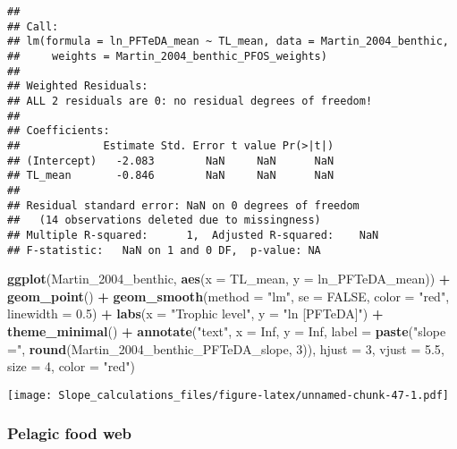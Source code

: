 \documentclass[
]{article}
\newenvironment{Shaded}{\begin{snugshade}}{\end{snugshade}}
\newcommand{\AttributeTok}[1]{\textcolor[rgb]{0.13,0.29,0.53}{#1}}
\newcommand{\ConstantTok}[1]{\textcolor[rgb]{0.56,0.35,0.01}{#1}}
\newcommand{\DecValTok}[1]{\textcolor[rgb]{0.00,0.00,0.81}{#1}}
\newcommand{\FloatTok}[1]{\textcolor[rgb]{0.00,0.00,0.81}{#1}}
\newcommand{\FunctionTok}[1]{\textcolor[rgb]{0.13,0.29,0.53}{\textbf{#1}}}
\newcommand{\NormalTok}[1]{#1}
\newcommand{\SpecialCharTok}[1]{\textcolor[rgb]{0.81,0.36,0.00}{\textbf{#1}}}
\newcommand{\StringTok}[1]{\textcolor[rgb]{0.31,0.60,0.02}{#1}}
\begin{document}
\begin{verbatim}
## 
## Call:
## lm(formula = ln_PFTeDA_mean ~ TL_mean, data = Martin_2004_benthic, 
##     weights = Martin_2004_benthic_PFOS_weights)
## 
## Weighted Residuals:
## ALL 2 residuals are 0: no residual degrees of freedom!
## 
## Coefficients:
##             Estimate Std. Error t value Pr(>|t|)
## (Intercept)   -2.083        NaN     NaN      NaN
## TL_mean       -0.846        NaN     NaN      NaN
## 
## Residual standard error: NaN on 0 degrees of freedom
##   (14 observations deleted due to missingness)
## Multiple R-squared:      1,  Adjusted R-squared:    NaN 
## F-statistic:   NaN on 1 and 0 DF,  p-value: NA
\end{verbatim}

\begin{Shaded}
\begin{Highlighting}[]
\FunctionTok{ggplot}\NormalTok{(Martin\_2004\_benthic, }\FunctionTok{aes}\NormalTok{(}\AttributeTok{x =}\NormalTok{ TL\_mean, }\AttributeTok{y =}\NormalTok{ ln\_PFTeDA\_mean)) }\SpecialCharTok{+}
  \FunctionTok{geom\_point}\NormalTok{() }\SpecialCharTok{+}
  \FunctionTok{geom\_smooth}\NormalTok{(}\AttributeTok{method =} \StringTok{"lm"}\NormalTok{, }\AttributeTok{se =} \ConstantTok{FALSE}\NormalTok{, }\AttributeTok{color =} \StringTok{"red"}\NormalTok{, }\AttributeTok{linewidth =} \FloatTok{0.5}\NormalTok{) }\SpecialCharTok{+}
  \FunctionTok{labs}\NormalTok{(}\AttributeTok{x =} \StringTok{"Trophic level"}\NormalTok{,}
       \AttributeTok{y =} \StringTok{"ln [PFTeDA]"}\NormalTok{) }\SpecialCharTok{+}
  \FunctionTok{theme\_minimal}\NormalTok{() }\SpecialCharTok{+}
  \FunctionTok{annotate}\NormalTok{(}\StringTok{"text"}\NormalTok{, }\AttributeTok{x =} \ConstantTok{Inf}\NormalTok{, }\AttributeTok{y =} \ConstantTok{Inf}\NormalTok{, }\AttributeTok{label =} \FunctionTok{paste}\NormalTok{(}\StringTok{"slope ="}\NormalTok{, }\FunctionTok{round}\NormalTok{(Martin\_2004\_benthic\_PFTeDA\_slope, }\DecValTok{3}\NormalTok{)), }
           \AttributeTok{hjust =} \DecValTok{3}\NormalTok{, }\AttributeTok{vjust =} \FloatTok{5.5}\NormalTok{, }\AttributeTok{size =} \DecValTok{4}\NormalTok{, }\AttributeTok{color =} \StringTok{"red"}\NormalTok{)}
\end{Highlighting}
\end{Shaded}

\texttt{[image: Slope\_calculations\_files/figure-latex/unnamed-chunk-47-1.pdf]}

\subsubsection{Pelagic food web}\label{pelagic-food-web}
\end{document}
